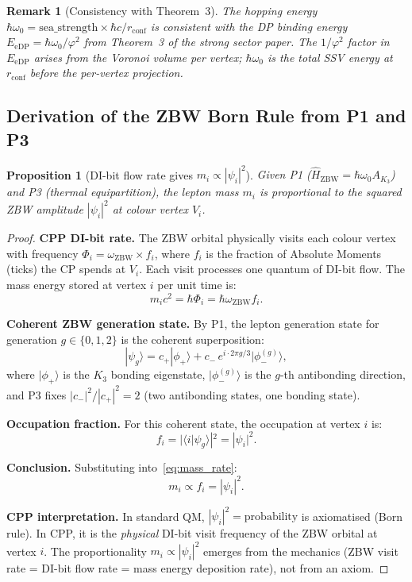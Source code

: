 \documentclass[11pt]{article}
\newtheorem{remark}{Remark}[section]
\newtheorem{proposition}[theorem]{Proposition}
\newcommand{\ZBW}{\mathrm{ZBW}}
\begin{document}
\begin{remark}[Consistency with Theorem~3]
The hopping energy $\hbar\omega_0 = \mathrm{sea\_strength}\times\hbar c/r_{\mathrm{conf}}$
is consistent with the DP binding energy $E_{\mathrm{eDP}} = \hbar\omega_0/\varphi^2$
from Theorem~3 of the strong sector paper. The $1/\varphi^2$ factor in
$E_{\mathrm{eDP}}$ arises from the Voronoi volume per vertex; $\hbar\omega_0$
is the total SSV energy at $r_{\mathrm{conf}}$ before the per-vertex projection.
\end{remark}

\subsection*{Derivation of the ZBW Born Rule from P1 and P3}
\label{prop:Born_derivation}

\begin{proposition}[DI-bit flow rate gives $m_i \propto |\psi_i|^2$]
Given P1 ($\hat{H}_\ZBW = \hbar\omega_0 A_{K_3}$) and P3 (thermal
equipartition), the lepton mass $m_i$ is proportional to the squared
ZBW amplitude $|\psi_i|^2$ at colour vertex $V_i$.
\end{proposition}

\begin{proof}
\textbf{CPP DI-bit rate.}
The ZBW orbital physically visits each colour vertex with frequency
$\Phi_i = \omega_{\ZBW} \times f_i$, where $f_i$ is the fraction of
Absolute Moments (ticks) the CP spends at $V_i$.  Each visit processes
one quantum of DI-bit flow.  The mass energy stored at vertex $i$ per
unit time is:
\begin{equation}
m_i c^2 = \hbar \Phi_i = \hbar\omega_{\ZBW} f_i.
\label{eq:mass_rate}
\end{equation}

\textbf{Coherent ZBW generation state.}
By P1, the lepton generation state for generation $g \in \{0,1,2\}$ is
the coherent superposition:
\begin{equation}
|\psi_g\rangle = c_+|\phi_+\rangle
+ c_-\, e^{i\cdot 2\pi g/3}|\phi_-^{(g)}\rangle,
\end{equation}
where $|\phi_+\rangle$ is the $K_3$ bonding eigenstate, $|\phi_-^{(g)}\rangle$
is the $g$-th antibonding direction, and P3 fixes
$|c_-|^2/|c_+|^2 = 2$ (two antibonding states, one bonding state).

\textbf{Occupation fraction.}
For this coherent state, the occupation at vertex $i$ is:
\begin{equation}
f_i = |\langle i|\psi_g\rangle|^2 = |\psi_i|^2.
\end{equation}

\textbf{Conclusion.}
Substituting into~\eqref{eq:mass_rate}:
\[
m_i \propto f_i = |\psi_i|^2.
\]

\textbf{CPP interpretation.}
In standard QM, $|\psi_i|^2 = \text{probability}$ is axiomatised (Born rule).
In CPP, it is the \emph{physical} DI-bit visit frequency of the ZBW orbital
at vertex $i$.  The proportionality $m_i \propto |\psi_i|^2$ emerges from
the mechanics (ZBW visit rate = DI-bit flow rate = mass energy deposition
rate), not from an axiom.
\end{proof}
\end{document}
